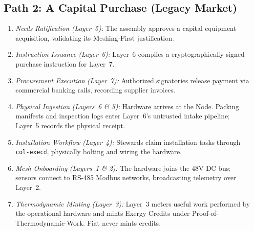 \subsection{Path 2: A Capital Purchase (Legacy Market)}
\begin{enumerate}
  \item \textit{Needs Ratification (Layer~5):} The assembly approves a capital equipment acquisition, validating its Meshing-First justification.
  \item \textit{Instruction Issuance (Layer~6):} Layer~6 compiles a cryptographically signed purchase instruction for Layer~7.
  \item \textit{Procurement Execution (Layer~7):} Authorized signatories release payment via commercial banking rails, recording supplier invoices.
  \item \textit{Physical Ingestion (Layers~6 \& 5):} Hardware arrives at the Node. Packing manifests and inspection logs enter Layer~6's untrusted intake pipeline; Layer~5 records the physical receipt.
  \item \textit{Installation Workflow (Layer~4):} Stewards claim installation tasks through \texttt{col-execd}, physically bolting and wiring the hardware.
  \item \textit{Mesh Onboarding (Layers~1 \& 2):} The hardware joins the 48V DC bus; sensors connect to RS-485 Modbus networks, broadcasting telemetry over Layer~2.
  \item \textit{Thermodynamic Minting (Layer~3):} Layer~3 meters useful work performed by the operational hardware and mints Exergy Credits under Proof-of-Thermodynamic-Work. Fiat never mints credits.
\end{enumerate}

